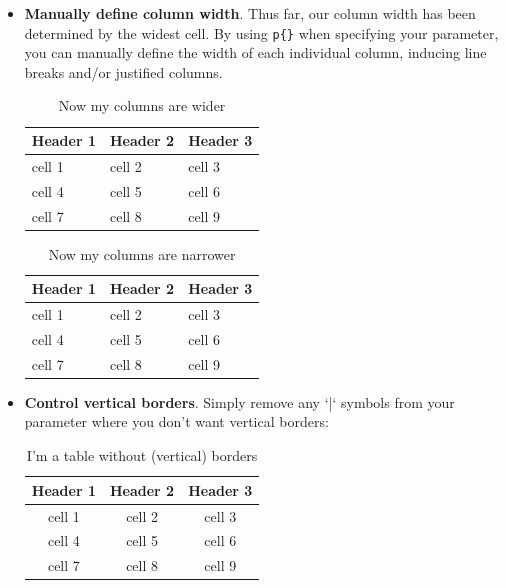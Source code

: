 \documentclass{article}
\begin{document}
\begin{itemize}
   
\item \textbf{Manually define column width}. Thus far, our column width has been determined by the widest cell. By using \verb|p{}| when specifying your parameter, you can manually define the width of each individual column, inducing line breaks and/or justified columns.

\newpage

\begin{table}[h!] 
\caption*{\large{Now my columns are wider}}
\centering
\begin{tabular}{|p{2in}|p{2in}|p{2in}|} %
\hline
\textbf{Header 1} & \textbf{Header 2} & \textbf{Header 3} \\
\hline\hline
cell 1 & cell 2 & cell 3 \\
\hline
cell 4 & cell 5 & cell 6 \\
\hline
cell 7 & cell 8 & cell 9 \\
\hline
\end{tabular}
\end{table}

\begin{table}[h!] 
\caption*{\large{Now my columns are narrower}}
\centering
\begin{tabular}{|p{1cm}|p{1cm}|p{1cm}|} %
\hline
\textbf{Header 1} & \textbf{Header 2} & \textbf{Header 3} \\
\hline\hline
cell 1 & cell 2 & cell 3 \\
\hline
cell 4 & cell 5 & cell 6 \\
\hline
cell 7 & cell 8 & cell 9 \\
\hline
\end{tabular}
\end{table}

\item \textbf{Control vertical borders}. Simply remove any `|` symbols from your parameter where you don't want vertical borders:

\begin{table}[h!] 
\caption*{\large{I'm a table without (vertical) borders}} 
\centering
\begin{tabular}{c c c} %
\hline
\textbf{Header 1} & \textbf{Header 2} & \textbf{Header 3} \\
\hline\hline
cell 1 & cell 2 & cell 3 \\
\hline
cell 4 & cell 5 & cell 6 \\
\hline
cell 7 & cell 8 & cell 9 \\
\hline
\end{tabular}
\end{table}


\end{itemize}
\end{document}
